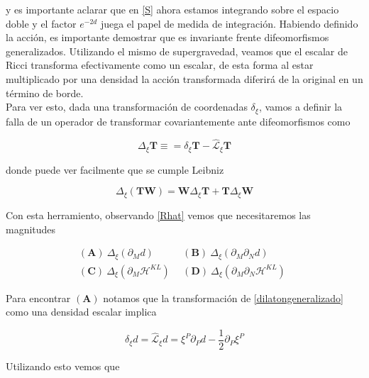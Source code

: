 \documentclass{article}
\numberwithin{equation}{section}
\begin{document}
y es importante aclarar que en \ref{S} ahora estamos integrando sobre el espacio doble y el factor $ e^{-2d} $ juega el papel de medida de integración. Habiendo definido la acción, es importante demostrar que es invariante frente difeomorfismos generalizados. Utilizando el mismo de supergravedad, veamos que el escalar de Ricci transforma efectivamente como un escalar, de esta forma al estar multiplicado por una densidad la acción transformada diferirá de la original en un término de borde.\\

Para ver esto, dada una transformación de coordenadas $ \delta_{\xi} $, vamos a definir la falla de un operador de transformar covariantemente ante difeomorfismos como

\begin{equation}\label{key}
\Delta_{\xi} \textbf{T} \equiv = \delta_{\xi} \textbf{T} - \hat{\mathcal{L}}_{\xi} \textbf{T}
\end{equation}

donde puede ver facilmente que se cumple Leibniz

\begin{equation}\label{key}
\Delta_{\xi} \left(\textbf{T}\textbf{W}\right) = \textbf{W}\Delta_{\xi} \textbf{T} + \textbf{T}\Delta_{\xi} \textbf{W}
\end{equation}

Con esta herramiento, observando \ref{Rhat} vemos que necesitaremos las magnitudes

\begin{equation}\label{key}
\begin{aligned}
 (\textbf{A}) \ \Delta_{\xi}\left(\partial_M d \right) \ \ &  (\textbf{B}) \ \Delta_{\xi}\left(\partial_M \partial_N d \right) \ \ \\
(\textbf{C}) \ \Delta_{\xi}\left(\partial_M \mathcal{H}^{KL} \right) \ \ &  (\textbf{D}) \ \Delta_{\xi}\left(\partial_M\partial_N \mathcal{H}^{KL} \right) \ \
\end{aligned}
\end{equation}

Para encontrar $ (\textbf{A}) $ notamos que la transformación de \ref{dilatongeneralizado} como una densidad escalar implica

\begin{equation}\label{key}
\delta_{\xi} d = \hat{\mathcal{L}}_{\xi} d = \xi^P \partial_P d - \frac{1}{2}\partial_P\xi^P
\end{equation}

Utilizando esto vemos que 
\end{document}
